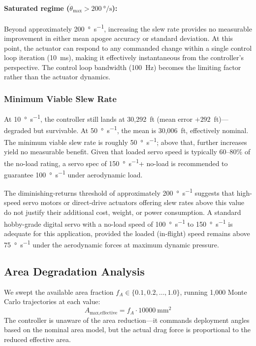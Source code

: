 \documentclass[11pt,letterpaper]{article}
\begin{document}
\paragraph{Saturated regime ($\dot{\theta}_{\max} > \SI{200}{\degree/\second}$):}
Beyond approximately \SI{200}{\degree\per\second}, increasing the slew rate provides no measurable improvement in either mean apogee accuracy or standard deviation. At this point, the actuator can respond to any commanded change within a single control loop iteration (\SI{10}{\milli\second}), making it effectively instantaneous from the controller's perspective. The control loop bandwidth (\SI{100}{\hertz}) becomes the limiting factor rather than the actuator dynamics.

\subsubsection{Minimum Viable Slew Rate}

At \SI{10}{\degree\per\second}, the controller still lands at 30{,}292~ft (mean error $+292$~ft)---degraded but survivable. At \SI{50}{\degree\per\second}, the mean is 30{,}006~ft, effectively nominal. The minimum viable slew rate is roughly \SI{50}{\degree\per\second}; above that, further increases yield no measurable benefit. Given that loaded servo speed is typically 60--80\% of the no-load rating, a servo spec of \SI{150}{\degree\per\second}+ no-load is recommended to guarantee \SI{100}{\degree\per\second} under aerodynamic load.

The diminishing-returns threshold of approximately \SI{200}{\degree\per\second} suggests that high-speed servo motors or direct-drive actuators offering slew rates above this value do not justify their additional cost, weight, or power consumption. A standard hobby-grade digital servo with a no-load speed of \SI{100}{\degree\per\second} to \SI{150}{\degree\per\second} is adequate for this application, provided the loaded (in-flight) speed remains above \SI{75}{\degree\per\second} under the aerodynamic forces at maximum dynamic pressure.

\subsection{Area Degradation Analysis}
\label{sec:area_degradation}

We swept the available area fraction $f_A \in \{0.1, 0.2, \ldots, 1.0\}$, running 1{,}000 Monte Carlo trajectories at each value:
\begin{equation}
    A_{\text{max,effective}} = f_A \cdot \SI{10000}{\milli\metre\squared}
    \label{eq:area_scaling}
\end{equation}
The controller is unaware of the area reduction---it commands deployment angles based on the nominal area model, but the actual drag force is proportional to the reduced effective area.
\end{document}
